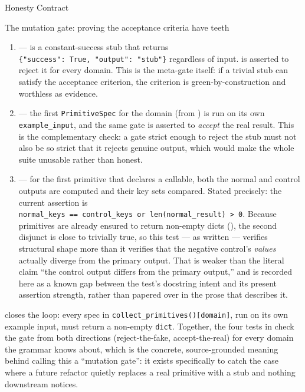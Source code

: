 \documentclass[
  ignorenonframetext,
]{beamer}
\newcounter{none} %
\providecommand{\tightlist}{%
  \setlength{\itemsep}{0pt}\setlength{\parskip}{0pt}}
\begin{document}
\begin{frame}{Honesty Contract}
\begin{block}{The mutation gate: proving the acceptance criteria have
teeth}
\begin{enumerate}
\tightlist
\item
  \textbf{} ---
   is a constant-success stub that returns
  \texttt{\{"success":\ True,\ "output":\ "stub"\}} regardless of input.
   is asserted to reject it
  for every domain. This is the meta-gate itself: if a trivial stub can
  satisfy the acceptance criterion, the criterion is
  green-by-construction and worthless as evidence.
\item
  \textbf{} ---
  the first \texttt{PrimitiveSpec} for the domain (from
  ) is run on its own
  \texttt{example\_input}, and the same gate is asserted to
  \emph{accept} the real result. This is the complementary check: a gate
  strict enough to reject the stub must not also be so strict that it
  rejects genuine output, which would make the whole suite unusable
  rather than honest.
\item
  \textbf{}
  --- for the first primitive that declares a 
  callable, both the normal and control outputs are computed and their
  key sets compared. Stated precisely: the current assertion is
  \texttt{normal\_keys\ ==\ control\_keys\ or\ len(normal\_result)\ \textgreater{}\ 0}.
  Because primitives are already ensured to return non-empty dicts
  (), the second
  disjunct is close to trivially true, so this test --- as written ---
  verifies structural shape more than it verifies that the negative
  control's \emph{values} actually diverge from the primary output. That
  is weaker than the literal claim ``the control output differs from the
  primary output,'' and is recorded here as a known gap between the
  test's docstring intent and its present assertion strength, rather
  than papered over in the prose that describes it.
\end{enumerate}

 closes the
loop: every spec in \texttt{collect\_primitives(){[}domain{]}}, run on
its own example input, must return a non-empty \texttt{dict}. Together,
the four tests in  check the gate from both
directions (reject-the-fake, accept-the-real) for every domain the
grammar knows about, which is the concrete, source-grounded meaning
behind calling this a ``mutation gate'': it exists specifically to catch
the case where a future refactor quietly replaces a real primitive with
a stub and nothing downstream notices.
\end{block}


\end{frame}
\end{document}

